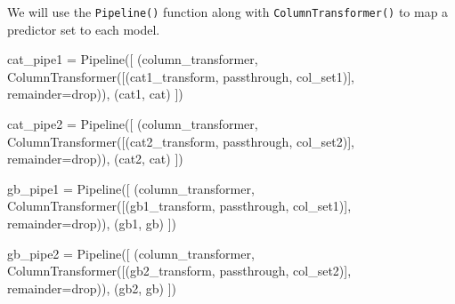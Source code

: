 \documentclass[
  letterpaper,
  DIV=11,
  numbers=noendperiod]{scrreprt}
\newenvironment{Shaded}{\begin{snugshade}}{\end{snugshade}}
\newcommand{\NormalTok}[1]{\textcolor[rgb]{0.00,0.23,0.31}{#1}}
\newcommand{\OperatorTok}[1]{\textcolor[rgb]{0.37,0.37,0.37}{#1}}
\newcommand{\StringTok}[1]{\textcolor[rgb]{0.13,0.47,0.30}{#1}}
\begin{document}
We will use the \texttt{Pipeline()} function along with
\texttt{ColumnTransformer()} to map a predictor set to each model.

\begin{Shaded}
\begin{Highlighting}[]
\NormalTok{cat\_pipe1 }\OperatorTok{=}\NormalTok{ Pipeline([}
\NormalTok{    (}\StringTok{\textquotesingle{}column\_transformer\textquotesingle{}}\NormalTok{, ColumnTransformer([(}\StringTok{\textquotesingle{}cat1\_transform\textquotesingle{}}\NormalTok{, }\StringTok{\textquotesingle{}passthrough\textquotesingle{}}\NormalTok{, col\_set1)], remainder}\OperatorTok{=}\StringTok{\textquotesingle{}drop\textquotesingle{}}\NormalTok{)),}
\NormalTok{    (}\StringTok{\textquotesingle{}cat1\textquotesingle{}}\NormalTok{, cat)}
\NormalTok{])}

\NormalTok{cat\_pipe2 }\OperatorTok{=}\NormalTok{ Pipeline([}
\NormalTok{    (}\StringTok{\textquotesingle{}column\_transformer\textquotesingle{}}\NormalTok{, ColumnTransformer([(}\StringTok{\textquotesingle{}cat2\_transform\textquotesingle{}}\NormalTok{, }\StringTok{\textquotesingle{}passthrough\textquotesingle{}}\NormalTok{, col\_set2)], remainder}\OperatorTok{=}\StringTok{\textquotesingle{}drop\textquotesingle{}}\NormalTok{)),}
\NormalTok{    (}\StringTok{\textquotesingle{}cat2\textquotesingle{}}\NormalTok{, cat)}
\NormalTok{])}

\NormalTok{gb\_pipe1 }\OperatorTok{=}\NormalTok{ Pipeline([}
\NormalTok{    (}\StringTok{\textquotesingle{}column\_transformer\textquotesingle{}}\NormalTok{, ColumnTransformer([(}\StringTok{\textquotesingle{}gb1\_transform\textquotesingle{}}\NormalTok{, }\StringTok{\textquotesingle{}passthrough\textquotesingle{}}\NormalTok{, col\_set1)], remainder}\OperatorTok{=}\StringTok{\textquotesingle{}drop\textquotesingle{}}\NormalTok{)),}
\NormalTok{    (}\StringTok{\textquotesingle{}gb1\textquotesingle{}}\NormalTok{, gb)}
\NormalTok{])}

\NormalTok{gb\_pipe2 }\OperatorTok{=}\NormalTok{ Pipeline([}
\NormalTok{    (}\StringTok{\textquotesingle{}column\_transformer\textquotesingle{}}\NormalTok{, ColumnTransformer([(}\StringTok{\textquotesingle{}gb2\_transform\textquotesingle{}}\NormalTok{, }\StringTok{\textquotesingle{}passthrough\textquotesingle{}}\NormalTok{, col\_set2)], remainder}\OperatorTok{=}\StringTok{\textquotesingle{}drop\textquotesingle{}}\NormalTok{)),}
\NormalTok{    (}\StringTok{\textquotesingle{}gb2\textquotesingle{}}\NormalTok{, gb)}
\NormalTok{])}
\end{Highlighting}
\end{Shaded}
\end{document}

